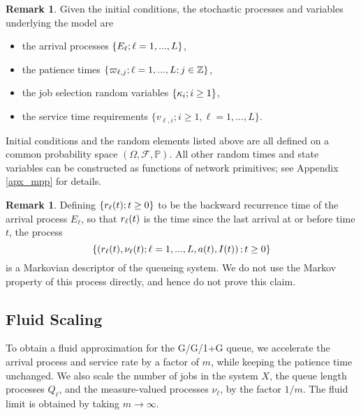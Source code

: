 \documentclass{article}
\theoremstyle{definition}
\newtheorem{remark}[theorem]{Remark}
\numberwithin{equation}{section}
\begin{document}
\begin{remark}
Given the initial conditions, the stochastic processes and variables underlying the model are
\begin{itemize}
\item the arrival processes $\{E_\ell;\ell=1,...,L\}$, 
\item the patience times $\{\varpi_{\ell,j};\ell=1,...,L;j\in\mathbb{Z}\}$,
\item the job selection random variables $\{\kappa_i;i\geq 1\}$, 
\item the service time requirements $\{v_{\ell,i};i\geq1,\ell=1,...,L\}.$ 
\end{itemize}
Initial conditions and the random elements listed above are all defined on a common probability space $(\Omega,\mathcal{F},\mathbb{P})$. All other random times and state variables can be constructed as functions of network primitives; see Appendix \ref{apx_mpp} for details.
\end{remark}

\begin{remark}
Defining $\{r_{\ell}(t);t\geq0\}$ to be the backward recurrence time of the arrival process $E_\ell$, so that $r_{\ell}(t)$ is the time since the last arrival at or before time $t$, the process
\[
\{\left( r_{\ell}(t), \nu_\ell(t);\ell=1,...,L,a(t),I(t) \right);t\geq0\}
\]
is a Markovian descriptor of the queueing system. We do not use the Markov property of this process directly, and hence do not prove this claim.
\end{remark}

\subsection{Fluid Scaling}\label{sec_seq}

To obtain a fluid approximation for the G/G/1+G queue, we accelerate the arrival process and service rate by a factor of $m$, while keeping the patience time unchanged. We also scale the number of jobs in the system $X$, the queue length processes $Q_\ell$, and the measure-valued processes $\nu_\ell$, by the factor $1/m$. The fluid limit is obtained by taking $m\to\infty$.
\end{document}
